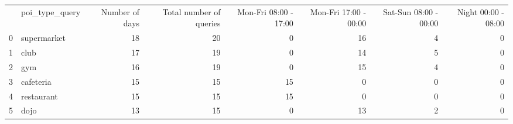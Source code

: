 \begin{tabular}{llrrrrrr}
 & poi_type_query & Number of days & Total number of queries & Mon-Fri 08:00 - 17:00 & Mon-Fri 17:00 - 00:00 & Sat-Sun 08:00 - 00:00 & Night 00:00 - 08:00 \\
0 & supermarket & 18 & 20 & 0 & 16 & 4 & 0 \\
1 & club & 17 & 19 & 0 & 14 & 5 & 0 \\
2 & gym & 16 & 19 & 0 & 15 & 4 & 0 \\
3 & cafeteria & 15 & 15 & 15 & 0 & 0 & 0 \\
4 & restaurant & 15 & 15 & 15 & 0 & 0 & 0 \\
5 & dojo & 13 & 15 & 0 & 13 & 2 & 0 \\
\end{tabular}
